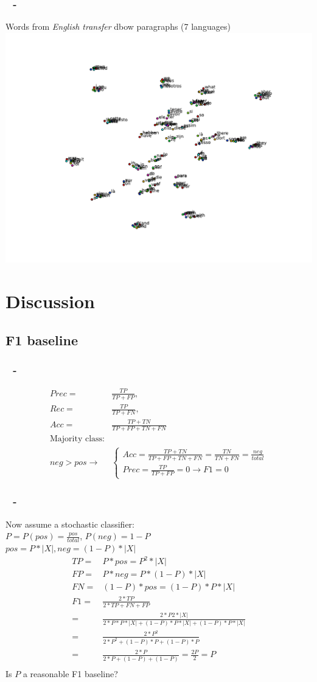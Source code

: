 \documentclass{beamer}
\newenvironment{dia}
{
\begin{frame}[fragile, environment=dia]
\frametitle{\insertsection
\ifx\insertsubsection\empty\else
      \,~-~\insertsubsection             %
   \fi}
}
{
\end{frame}
}
\begin{document}
\begin{dia}
Words from \emph{English transfer} dbow paragraphs (7 languages)
\includegraphics[width=1\linewidth]{figures/transfer_en25freq7}
\end{dia}

\section{Discussion}
\subsection*{F1 baseline}

\begin{dia}
\begin{align*}
Prec=&\frac{TP}{TP+FP}, \\
Rec=&\frac{TP}{TP+FN}, \\
Acc=&\frac{TP+TN}{TP+FP+TN+FN}\\
\text{Majority class:}\\
 neg>pos\rightarrow& \begin{cases}Acc=\frac{TP+TN}{TP+FP+TN+FN}=\frac{TN}{TN+FN}=\frac{neg}{total}\\Prec=\frac{TP}{TP+FP}=0\rightarrow F1=0\end{cases}
\end{align*}
\end{dia}
\begin{dia}
Now assume a stochastic classifier: \\
$P=P(pos)=\frac{pos}{total}$, $P(neg)=1-P$\\

$pos=P*|X|, neg=(1-P)*|X|$
\begin{align*}
TP=&P*pos=P^2*|X|\\
FP=&P*neg=P*(1-P)*|X|\\
FN=&(1-P)*pos=(1-P)*P*|X|\\
F1=&\frac{2*TP}{2*TP+FN+FP}\\
=&\frac{2*P2*|X|}{2*P*P*|X|+(1-P)*P*|X|+(1-P)*P*|X|}\\
=&\frac{2*P^2}{2*P^2+(1-P)*P+(1-P)*P}\\
=&\frac{2*P}{2*P+(1-P)+(1-P)}=\frac{2P}{2}=P\\
\end{align*}
Is $P$ a reasonable F1 baseline?
\end{dia}
\end{document}
